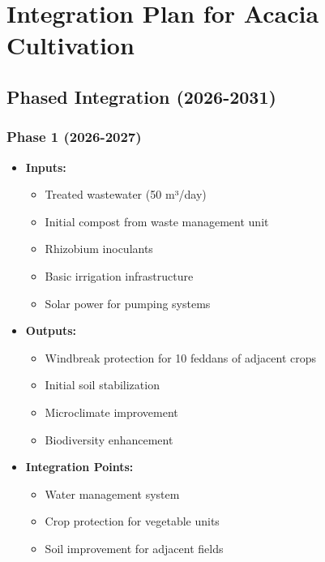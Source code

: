 \section{Integration Plan for Acacia Cultivation}

\subsection{Phased Integration (2026-2031)}

\subsubsection{Phase 1 (2026-2027)}
\begin{itemize}
    \item \textbf{Inputs:}
    \begin{itemize}
        \item Treated wastewater (50 m³/day)
        \item Initial compost from waste management unit
        \item Rhizobium inoculants
        \item Basic irrigation infrastructure
        \item Solar power for pumping systems
    \end{itemize}
    \item \textbf{Outputs:}
    \begin{itemize}
        \item Windbreak protection for 10 feddans of adjacent crops
        \item Initial soil stabilization
        \item Microclimate improvement
        \item Biodiversity enhancement
    \end{itemize}
    \item \textbf{Integration Points:}
    \begin{itemize}
        \item Water management system
        \item Crop protection for vegetable units
        \item Soil improvement for adjacent fields
    \end{itemize}
\end{itemize}

